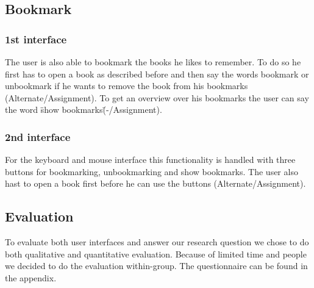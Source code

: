 \documentclass[a4paper, 10pt]{article}
\begin{document}
	\subsection{Bookmark}
	
	\subsubsection{1st interface}
	
	\par{The user is also able to bookmark the books he likes to remember. To do so he first has to open a book as described before and then say the words bookmark or unbookmark if he wants to remove the book from his bookmarks (Alternate/Assignment). To get an overview over his bookmarks the user can say the word \"show bookmarks\" (-/Assignment).}
	
	\subsubsection{2nd interface}
	
	\par{For the keyboard and mouse interface this functionality is handled with three buttons for bookmarking, unbookmarking and show bookmarks. The user also hast to open a book first before he can use the buttons (Alternate/Assignment).}
	
	
	\subsection{Evaluation}
	
	\par{To evaluate both user interfaces and answer our research question we chose to do both qualitative and quantitative evaluation. Because of limited time and people we decided to do the evaluation within-group. The questionnaire can be found in the appendix.}
	
	
	
	
	
	
\end{document}
